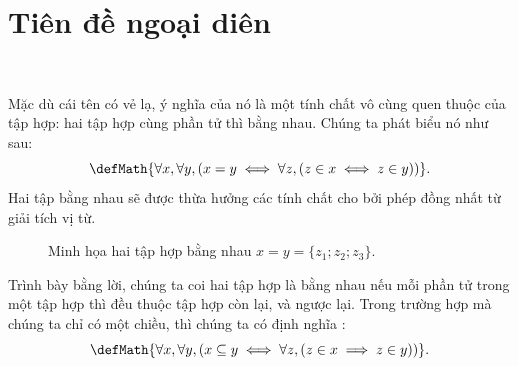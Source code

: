 \section{Tiên đề ngoại diên}

\

Mặc dù cái tên có vẻ lạ, ý nghĩa của nó là một tính chất vô cùng quen thuộc của tập hợp: hai tập hợp cùng phần tử thì bằng nhau. Chúng ta phát biểu nó như sau:
$$
   \defMath{\forall x, \forall y, \left( x = y \iff  \forall z, \left( z \in x \iff z \in y \right) \right)}.
$$
Hai tập bằng nhau sẽ được thừa hưởng các tính chất cho bởi phép đồng nhất từ giải tích vị từ.

\begin{figure}[H]
    \begin{center}
    \end{center}
    \caption{Minh họa hai tập hợp bằng nhau $x = y = \{z_1; z_2; z_3\}$.}
\end{figure}

Trình bày bằng lời, chúng ta coi hai tập hợp là bằng nhau nếu mỗi phần tử trong một tập hợp thì đều thuộc tập hợp còn lại, và ngược lại. Trong trường hợp mà chúng ta chỉ có một chiều, thì chúng ta có định nghĩa :
$$
    \defMath{\forall x, \forall y, \left( x \subseteq y \iff  \forall z, \left( z \in x \implies z \in y \right) \right)}.
$$


